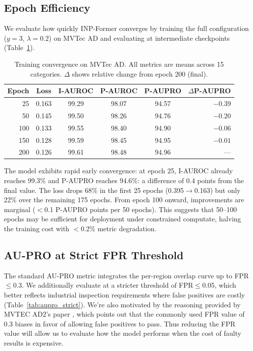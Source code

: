 \documentclass[10pt]{article} %
\begin{document}
\subsection{Epoch Efficiency}
\label{sec:epoch_efficiency}

We evaluate how quickly INP-Former converges by training the full configuration ($y=3$, $\lambda=0.2$) on MVTec AD and evaluating at intermediate checkpoints (Table~\ref{tab:epoch_eff}).

\begin{table}[t]
\caption{Training convergence on MVTec AD. All metrics are means across 15 categories. $\Delta$ shows relative change from epoch 200 (final).}
\label{tab:epoch_eff}
\begin{center}
\begin{tabular}{rccccr}
\toprule
Epoch & Loss & I-AUROC & P-AUROC & P-AUPRO & $\Delta$P-AUPRO \\
\midrule
25  & 0.163 & 99.29 & 98.07 & 94.57 & $-0.39$ \\
50  & 0.145 & 99.50 & 98.26 & 94.76 & $-0.20$ \\
100 & 0.133 & 99.55 & 98.40 & 94.90 & $-0.06$ \\
150 & 0.128 & 99.59 & 98.45 & 94.95 & $-0.01$ \\
200 & 0.126 & 99.61 & 98.48 & 94.96 & --- \\
\bottomrule
\end{tabular}
\end{center}
\end{table}

The model exhibits rapid early convergence: at epoch 25, I-AUROC already reaches 99.3\% and P-AUPRO reaches 94.6\%: a difference of 0.4 points from the final value. The loss drops 68\% in the first 25 epochs (0.395$\to$0.163) but only 22\% over the remaining 175 epochs. From epoch 100 onward, improvements are marginal ($<$0.1 P-AUPRO points per 50 epochs). This suggests that 50--100 epochs may be sufficient for deployment under constrained computate, halving the training cost with $<$0.2\% metric degradation.


\subsection{AU-PRO at Strict FPR Threshold}
\label{sec:aupro_strict}

The standard AU-PRO metric integrates the per-region overlap curve up to FPR$\leq$0.3. We additionally evaluate at a stricter threshold of FPR$\leq$0.05, which better reflects industrial inspection requirements where false positives are costly (Table~\ref{tab:aupro_strict}). We're also motivated by the reasoning provided by MVTEC AD2's paper \cite{mvtecad2_2024}, which points out that the commonly used FPR value of 0.3 biases in favor of allowing false positives to pass. Thus reducing the FPR value will allow us to evaluate how the model performs when the cost of faulty results is expensive.
\end{document}
